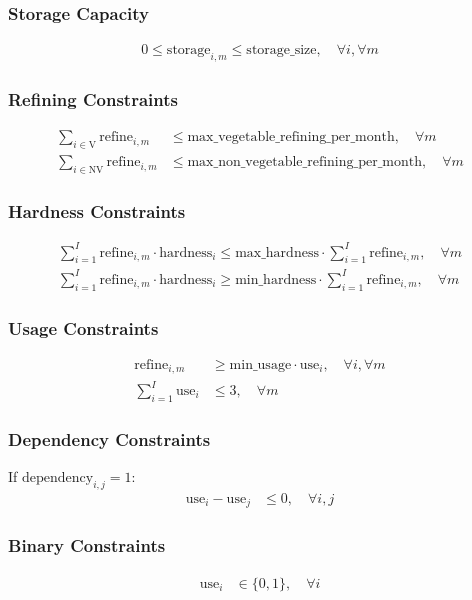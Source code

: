 \documentclass{article}
\begin{document}
\subsubsection*{Storage Capacity}
\begin{align*}
0 \leq \text{storage}_{i,m} \leq \text{storage\_size}, \quad \forall i, \forall m
\end{align*}

\subsubsection*{Refining Constraints}
\begin{align*}
\sum_{i \in \text{V}} \text{refine}_{i,m} & \leq \text{max\_vegetable\_refining\_per\_month}, \quad \forall m \\
\sum_{i \in \text{NV}} \text{refine}_{i,m} & \leq \text{max\_non\_vegetable\_refining\_per\_month}, \quad \forall m
\end{align*}

\subsubsection*{Hardness Constraints}
\begin{align*}
\sum_{i=1}^{I} \text{refine}_{i,m} \cdot \text{hardness}_i \leq \text{max\_hardness} \cdot \sum_{i=1}^{I} \text{refine}_{i,m}, \quad \forall m \\
\sum_{i=1}^{I} \text{refine}_{i,m} \cdot \text{hardness}_i \geq \text{min\_hardness} \cdot \sum_{i=1}^{I} \text{refine}_{i,m}, \quad \forall m
\end{align*}

\subsubsection*{Usage Constraints}
\begin{align*}
\text{refine}_{i,m} & \geq \text{min\_usage} \cdot \text{use}_i, \quad \forall i, \forall m \\
\sum_{i=1}^{I} \text{use}_i & \leq 3, \quad \forall m
\end{align*}

\subsubsection*{Dependency Constraints}
If \(\text{dependency}_{i,j} = 1\):
\begin{align*}
\text{use}_i - \text{use}_j & \leq 0, \quad \forall i, j
\end{align*}

\subsubsection*{Binary Constraints}
\begin{align*}
\text{use}_i & \in \{0, 1\}, \quad \forall i
\end{align*}
\end{document}
